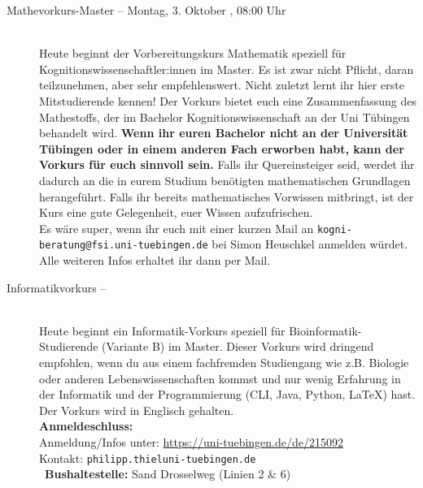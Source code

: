 \begin{description}

\ifkogwiss
    \ifmaster
        \item[Mathevorkurs-Master -- Montag, 3. Oktober \YEAR, 08:00 Uhr]\ \\
        Heute beginnt der Vorbereitungskurs Mathematik speziell für Kognitionswissenschaftler:innen im Master. Es ist zwar nicht Pflicht, daran teilzunehmen, aber sehr empfehlenswert. Nicht zuletzt lernt ihr hier erste Mitstudierende kennen! Der Vorkurs bietet euch eine Zusammenfassung des Mathestoffs, der im Bachelor Kognitionswissenschaft an der Uni Tübingen behandelt wird.
        \textbf{Wenn ihr euren Bachelor nicht an der Universität Tübingen oder in einem anderen Fach erworben habt, kann der Vorkurs für euch sinnvoll sein.} Falls ihr Quereinsteiger seid, werdet ihr dadurch an die in eurem Studium benötigten mathematischen Grundlagen herangeführt. Falls ihr bereits mathematisches Vorwissen mitbringt, ist der Kurs eine gute Gelegenheit, euer Wissen aufzufrischen.\\
         Es wäre super, wenn ihr euch mit einer kurzen Mail an \texttt{kogni-beratung@fsi.uni-tuebingen.de} bei Simon Heuschkel anmelden würdet. Alle weiteren Infos erhaltet ihr dann per Mail.
    \fi
\fi

\ifmaster
    \ifbinfo
        \item[Informatikvorkurs -- \bioinfoDatum~\YEAR]\ \\
		Heute beginnt ein Informatik-Vorkurs speziell für Bioinformatik-Studierende (Variante B) im Master. Dieser Vorkurs wird dringend empfohlen, wenn du aus einem fachfremden Studiengang wie z.B. Biologie oder anderen Lebenswissenschaften kommst und nur wenig Erfahrung in der Informatik und der Programmierung (CLI, Java, Python, \LaTeX) hast. Der Vorkurs wird in Englisch gehalten. \\
		\textbf{Anmeldeschluss:} \bioinfoAnmeldung\YEAR\\
		Anmeldung/Infos unter: \url{https://uni-tuebingen.de/de/215092}\\
		Kontakt: \texttt{philipp.thiel\At uni-tuebingen.de}\\
        ~\textbf{Bushaltestelle:} Sand Drosselweg (Linien 2 \& 6)
    \fi
\fi


\end{description}
